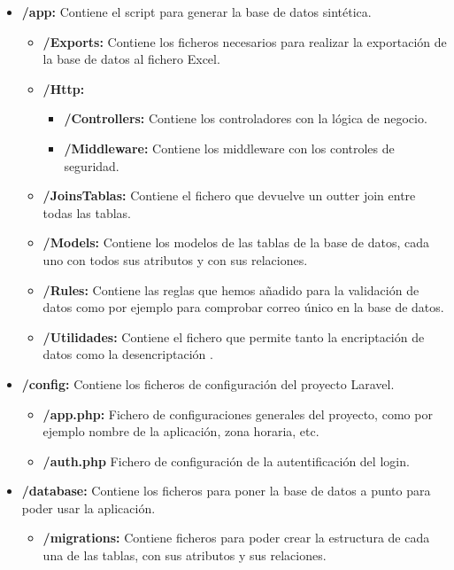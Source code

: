 \begin{itemize}
    \item \textbf{/app:} Contiene el script para generar la base de datos sintética.
    \begin{itemize}
        \item \textbf{/Exports:} Contiene los ficheros necesarios para realizar la exportación de la base de datos al fichero Excel.
        \item \textbf{/Http:} 
        \begin{itemize}
            \item \textbf{/Controllers:} Contiene los controladores con la lógica de negocio.
            \item \textbf{/Middleware:} Contiene los middleware con los controles de seguridad.
        \end{itemize}
        \item \textbf{/JoinsTablas:} Contiene el fichero que devuelve un outter join entre todas las tablas.
        \item \textbf{/Models:} Contiene los modelos de las tablas de la base de datos, cada uno con todos sus atributos y con sus relaciones.
        \item \textbf{/Rules:} Contiene las reglas que hemos añadido para la validación de datos como por ejemplo para comprobar correo único en la base de datos.
        \item \textbf{/Utilidades:} Contiene el fichero que permite tanto la encriptación de datos como la desencriptación .
    \end{itemize}
    \item \textbf{/config:} Contiene los ficheros de configuración del proyecto Laravel.
    \begin{itemize}
        \item \textbf{/app.php:} Fichero de configuraciones generales del proyecto, como por ejemplo nombre de la aplicación, zona horaria, etc.
        \item \textbf{/auth.php} Fichero de configuración de la autentificación del login.
    \end{itemize}
    \item \textbf{/database:} Contiene los ficheros para poner la base de datos a punto para poder usar la aplicación.
    \begin{itemize}
        \item \textbf{/migrations:} Contiene ficheros para poder crear la estructura de cada una de las tablas, con sus atributos y sus relaciones.

\end{itemize}
\end{itemize}
